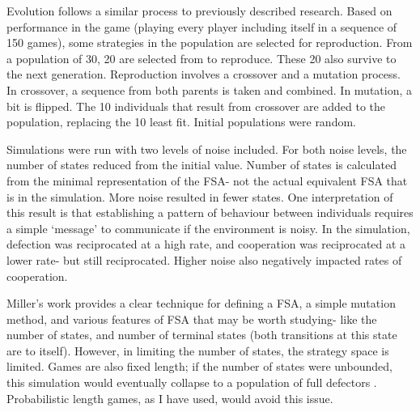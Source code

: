 \documentclass[a4paper,11pt,bcshonoursthesis,singlespace,twoside,thesisdraft,pdflatex]{cssethesis}
\begin{document}
Evolution follows a similar process to previously described research. 
Based on performance in the game (playing every player including itself in a sequence of 150 games), some strategies in the population are selected for reproduction. 
From a population of 30, 20 are selected from to reproduce. 
These 20 also survive to the next generation. 
Reproduction involves a crossover and a mutation process. 
In crossover, a sequence from both parents is taken and combined. 
In mutation, a bit is flipped. 
The 10 individuals that result from crossover are added to the population, replacing the 10 least fit. 
Initial populations were random. 

Simulations were run with two levels of noise included.  
For both noise levels, the number of states reduced from the initial value. 
Number of states is calculated from the minimal representation of the FSA- not the actual equivalent FSA that is in the simulation. 
More noise resulted in fewer states. 
One interpretation of this result is that establishing a pattern of behaviour between individuals requires a simple `message' to communicate if the environment is noisy. 
In the simulation, defection was reciprocated at a high rate, and cooperation was reciprocated at a lower rate- but still reciprocated. 
Higher noise also negatively impacted rates of cooperation. 

Miller's work provides a clear technique for defining a FSA, a simple mutation method, and various features of FSA that may be worth studying- like the number of states, and number of terminal states (both transitions at this state are to itself). However, in limiting the number of states, the strategy space is limited. Games are also fixed length; if the number of states were unbounded, this simulation would eventually collapse to a population of full defectors \citep{aumann1995backward}. Probabilistic length games, as I have used, would avoid this issue.
\end{document}
